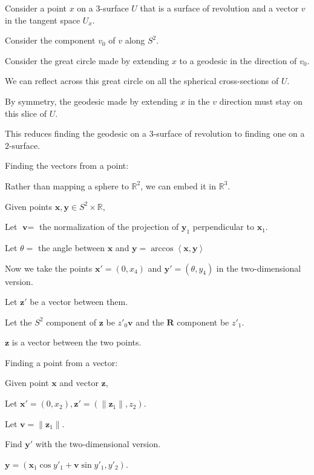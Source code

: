 \documentclass[12pt]{amsart}
\begin{document}
Consider a point $x$ on a $3$-surface $U$ that is a surface of revolution and a vector $v$ in the tangent space $U_x$.

Consider the component $v_0$ of $v$ along $S^2$.

Consider the great circle made by extending $x$ to a geodesic in the direction of $v_0$.

We can reflect across this great circle on all the spherical cross-sections of $U$.

By symmetry, the geodesic made by extending $x$ in the $v$ direction must stay on this slice of $U$.

This reduces finding the geodesic on a $3$-surface of revolution to finding one on a $2$-surface.

\bigskip

Finding the vectors from a point:

\bigskip

Rather than mapping a sphere to $\mathbb{R}^2$, we can embed it in $\mathbb{R}^3$.

Given points $\textbf{x}, \textbf{y} \in S^2 \times \mathbb{R}$,

Let $\textbf{v} =$ the normalization of the projection of $\textbf{y}_1$ perpendicular to $\textbf{x}_1$.

Let $\theta =$ the angle between $\textbf{x}$ and $\textbf{y} = \arccos\left<\textbf{x},\textbf{y}\right>$

Now we take the points $\textbf{x}' = (0,x_4)$ and $\textbf{y}' = (\theta, y_4)$ in the two-dimensional version.

Let $\textbf{z}'$ be a vector between them.

Let the $S^2$ component of $\textbf{z}$ be $z'_0\textbf{v}$ and the $\textbf{R}$ component be $z'_1$.

$\textbf{z}$ is a vector between the two points.

\bigskip

Finding a point from a vector:

\bigskip

Given point $\textbf{x}$ and vector $\textbf{z}$,

Let $\textbf{x}' = (0,x_2), \textbf{z}' = (\|\textbf{z}_1\|,z_2)$.

Let $\textbf{v} = \|\textbf{z}_1\|$.

Find $\textbf{y}'$ with the two-dimensional version.

$\textbf{y} = (\textbf{x}_1\cos y'_1+\textbf{v}\sin y'_1, y'_2)$.
\end{document}
